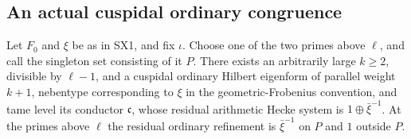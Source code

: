 \subsection{An actual cuspidal ordinary congruence}

\begin{proposition}
\label{claim:SX2}
Let $F_0$ and $\xi$ be as in SX1, and fix $\iota$.
Choose one of the two primes above $\ell$, and call the singleton
set consisting of it $P$.  There exists an arbitrarily large
$k\ge2$, divisible by $\ell-1$, and a cuspidal ordinary Hilbert
eigenform of parallel weight $k+1$, nebentype corresponding to
$\xi$ in the geometric-Frobenius convention, and tame level its
conductor $\mathfrak c$, whose residual arithmetic Hecke system
is $1\oplus\bar\xi^{-1}$.  At the primes above $\ell$
the residual ordinary refinement is $\bar\xi^{-1}$ on $P$ and $1$
outside $P$.
\end{proposition}
